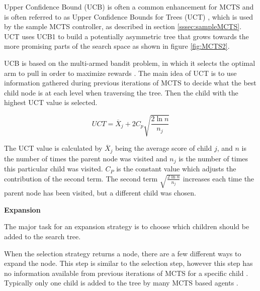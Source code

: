\documentclass[journal]{IEEEtran}
\begin{document}
			Upper Confidence Bound (UCB) is often a common enhancement for MCTS and is often referred to as Upper Confidence Bounds for Trees (UCT) \cite{bravi2017evolving}, which is used by the sample MCTS controller, as described in section \ref{sssec:sampleMCTS}. 
			UCT uses UCB1 to build a potentially asymmetric tree that grows towards the more promising parts of the search space as shown in figure \ref{fig:MCTS2}. 

			UCB is based on the multi-armed bandit problem, in which it selects the optimal arm to pull in order to maximize rewards \cite{kocsis2006bandit, browne2012survey, gelly2006modification}.
			The main idea of UCT is to use information gathered during previous iterations of MCTS to decide what the best child node is at each level when traversing the tree. Then the child with the highest UCT value is selected. 
			
			

			\begin{equation} \label{eqUCT}
				 UCT  = \overline{X} _j + 2C _p \sqrt{\frac{ 2 \ln n}{n _j}}
			\end{equation} 
			
			The UCT value is calculated by \( \overline{X} _j\)   being the average score of child \( j \), and \( n \) is the number of times the parent node was visited and \(n _j \) is the number of times this particular child was visited. \( C _P \) is the constant value which adjusts the contribution of the second term. 
			The second term \( \sqrt{\frac{ 2 \ln n}{n _j}} \)  increases each time the parent node has been visited, but a different child was chosen.
			
		
		\textbf{Expansion}
		
			The major task for an expansion strategy is to choose which children should be added to the search tree.
			
			When the selection strategy returns a node, there are a few different ways to expand the node. This step is similar to the selection step, however this step has no information available from previous iterations of MCTS for a specific child \cite{schuster2015mcts}. 
			Typically only one child is added to the tree by many MCTS based agents \cite{chaslot2008monte, schuster2015mcts}. 
			
\end{document}
